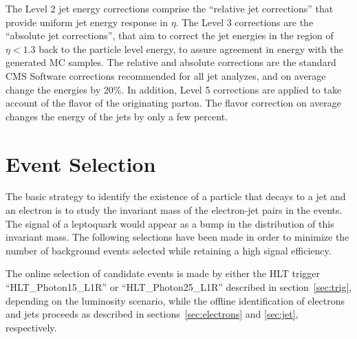\documentclass{cmspaper}
\begin{document}
\begin{linenumbers}
The Level 2 jet energy corrections comprise the 
``relative jet corrections'' that provide uniform jet energy response in $\eta$.  
The Level 3 corrections are the ``absolute jet corrections'', that aim to correct  the jet energies in the 
region of $\eta < 1.3$ back to the particle level energy, to assure agreement in energy with the generated MC samples. 
The relative and absolute corrections are the standard CMS Software corrections recommended for all jet analyzes,
and on average change the energies by 20\%.
In addition, Level 5 corrections are applied to take account of the flavor of the originating parton.
The flavor correction on average changes the energy of the jets by only a few percent.

\section{Event Selection} \label{sec:eventSelection}
The basic strategy to identify the existence of a particle that decays to a jet and an electron 
is to study the invariant mass of the electron-jet pairs in the events. 
The signal of a leptoquark would appear as a bump in the distribution of this invariant mass.
The following selections have been made in order to minimize the number of background events 
selected while retaining a high signal efficiency.

The online selection of candidate events is made by either the HLT trigger ``HLT\_Photon15\_L1R'' 
or ``HLT\_Photon25\_L1R'' described in section~\ref{sec:trig}, depending on the luminosity scenario, 
while the offline identification of electrons and jets 
proceeds as described in sections~\ref{sec:electrons} and \ref{sec:jet}, respectively.


\end{linenumbers}
\end{document}
